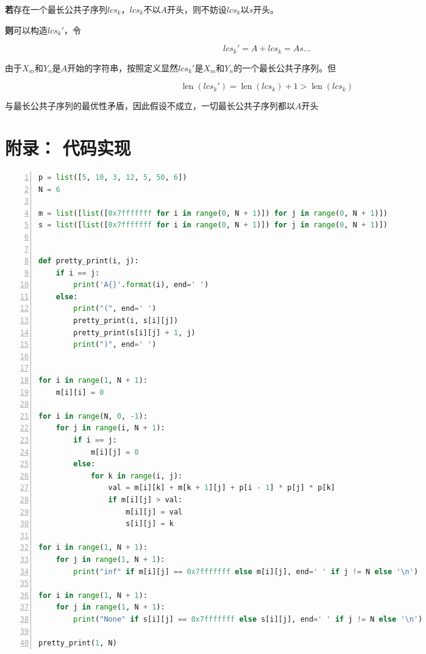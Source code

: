 \documentclass[a4paper,twoside]{article}
\begin{document}
\begin{spacing}{1.2}
\textbf{若}存在一个最长公共子序列${lcs}_k$，${lcs}_k$不以$A$开头，则不妨设${lcs}_k$以$s$开头。

\textbf{则}可以构造${lcs}_k'$，令

$$
{lcs}_k'=A+{lcs}_k=As\ldots
$$

由于$X_m$和$Y_n$是$A$开始的字符串，按照定义显然${lcs}_k'$是$X_m$和$Y_n$的一个最长公共子序列。但

$$
\mathop{len}({lcs}_k')=\mathop{len}({lcs}_k)+1 > \mathop{len}({lcs}_k)
$$

与最长公共子序列的最优性矛盾，因此假设不成立，一切最长公共子序列都以$A$开头

\clearpage
\appendix

\section{附录： 代码实现}
\label{sec:app_impl}


\begin{lstlisting}[language=Python,numbers=left,style=PythonStyle,caption=矩阵连乘,label={code:implmat}]
p = list([5, 10, 3, 12, 5, 50, 6])
N = 6

m = list([list([0x7fffffff for i in range(0, N + 1)]) for j in range(0, N + 1)])
s = list([list([0x7fffffff for i in range(0, N + 1)]) for j in range(0, N + 1)])


def pretty_print(i, j):
    if i == j:
        print('A{}'.format(i), end=' ')
    else:
        print("(", end=' ')
        pretty_print(i, s[i][j])
        pretty_print(s[i][j] + 1, j)
        print(")", end=' ')


for i in range(1, N + 1):
    m[i][i] = 0

for i in range(N, 0, -1):
    for j in range(i, N + 1):
        if i == j:
            m[i][j] = 0
        else:
            for k in range(i, j):
                val = m[i][k] + m[k + 1][j] + p[i - 1] * p[j] * p[k]
                if m[i][j] > val:
                    m[i][j] = val
                    s[i][j] = k

for i in range(1, N + 1):
    for j in range(1, N + 1):
        print("inf" if m[i][j] == 0x7fffffff else m[i][j], end=' ' if j != N else '\n')

for i in range(1, N + 1):
    for j in range(1, N + 1):
        print("None" if s[i][j] == 0x7fffffff else s[i][j], end=' ' if j != N else '\n')

pretty_print(1, N)

\end{lstlisting}

\end{spacing}
\end{document}
